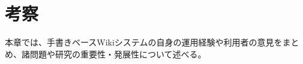 \chapter{考察}
\label{chap:kosatsu}

本章では、手書きベースWikiシステムの自身の運用経験や利用者の意見をまとめ、諸問題や研究の重要性・発展性について述べる。

\newpage